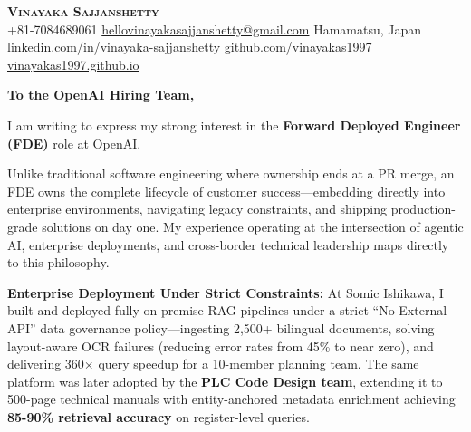 \documentclass[letterpaper,11pt]{article}
\begin{document}
\begin{center}
    \textbf{\Huge \scshape Vinayaka Sajjanshetty} \\ \vspace{4pt}
    \small
    \faPhone \thinspace +81-7084689061 \quad
    \faEnvelope \thinspace \href{mailto:hellovinayakasajjanshetty@gmail.com}{hellovinayakasajjanshetty@gmail.com} \quad
    \faMapMarker \thinspace Hamamatsu, Japan \\ \vspace{3pt}
    \faLinkedin \thinspace \href{https://www.linkedin.com/in/vinayaka-sajjanshetty-91033111a}{linkedin.com/in/vinayaka-sajjanshetty} \quad
    \faGithub \thinspace \href{https://github.com/vinayakas1997}{github.com/vinayakas1997} \quad
    \faGlobe \thinspace \href{https://vinayakas1997.github.io/my-project-docs/}{vinayakas1997.github.io}
\end{center}

\vspace{10pt}

\textbf{To the OpenAI Hiring Team,}

\vspace{6pt}

I am writing to express my strong interest in the \textbf{Forward Deployed Engineer (FDE)} role at OpenAI.

Unlike traditional software engineering where ownership ends at a PR merge, an FDE owns the complete lifecycle of customer success---embedding directly into enterprise environments, navigating legacy constraints, and shipping production-grade solutions on day one. My experience operating at the intersection of agentic AI, enterprise deployments, and cross-border technical leadership maps directly to this philosophy.

\vspace{6pt}

\textbf{Enterprise Deployment Under Strict Constraints:} At Somic Ishikawa, I built and deployed fully on-premise RAG pipelines under a strict ``No External API'' data governance policy---ingesting 2,500+ bilingual documents, solving layout-aware OCR failures (reducing error rates from 45\% to near zero), and delivering 360$\times$ query speedup for a 10-member planning team. The same platform was later adopted by the \textbf{PLC Code Design team}, extending it to 500-page technical manuals with entity-anchored metadata enrichment achieving \textbf{85-90\% retrieval accuracy} on register-level queries.

\vspace{6pt}
\end{document}
